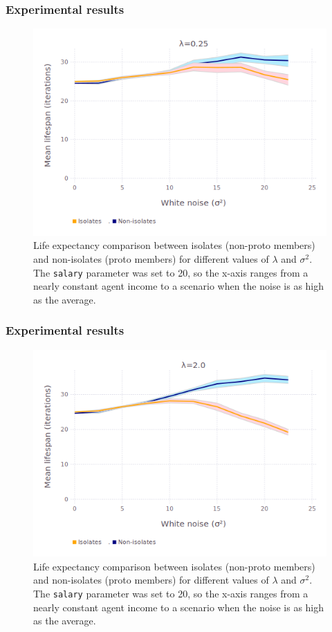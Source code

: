\documentclass{beamer}
\begin{document}
\begin{frame}[t]
\frametitle{Experimental results}
\begin{figure}[ht]
\centering
\includegraphics[scale=.4]{figures/avgLifespanLambda_025.png}
\caption{Life expectancy comparison between isolates (non-proto members) and
non-isolates (proto members) for different values of $\lambda$ and $\sigma^2$.
The \texttt{salary} parameter was set to 20, so the x-axis ranges from a nearly
constant agent income to a scenario when the noise is as high as the average.}
\label{fig:avgLifespanLambda025}
\end{figure}
\end{frame}

\begin{frame}[t]
\frametitle{Experimental results}
\begin{figure}[ht]
\centering
\includegraphics[scale=.4]{figures/avgLifespanLambda2.png}
\caption{Life expectancy comparison between isolates (non-proto members) and
non-isolates (proto members) for different values of $\lambda$ and $\sigma^2$.
The \texttt{salary} parameter was set to 20, so the x-axis ranges from a nearly
constant agent income to a scenario when the noise is as high as the average.}
\label{fig:avgLifespanLambda2}
\end{figure}
\end{frame}
\end{document}
